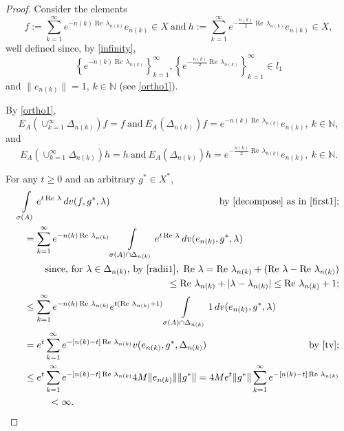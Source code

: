\documentclass{amsart}
\theoremstyle{plain}
\theoremstyle{definition}
\begin{document}
\begin{proof}
Consider the elements
\begin{equation*}
f:=\sum_{k=1}^\infty e^{-n(k)\operatorname{Re\,}\lambda_{n(k)}}e_{n(k)}\in X
\ \text{and}\ h:=\sum_{k=1}^\infty e^{-\frac{n(k)}{2}\operatorname{Re\,}\lambda_{n(k)}}e_{n(k)}\in X,
\end{equation*}
well defined since, by \eqref{infinity},
\[
\left\{e^{-n(k)\operatorname{Re\,}\lambda_{n(k)}}\right\}_{k=1}^\infty,
\left\{e^{-\frac{n(k)}{2}\operatorname{Re\,}\lambda_{n(k)}}\right\}_{k=1}^\infty
\in l_1
\]
and $\|e_{n(k)}\|=1$, $k\in{{\mathbb N}}$ (see \eqref{ortho1}).

By \eqref{ortho1},
\begin{equation}\label{subvectors1}
E_A(\cup_{k=1}^\infty\Delta_{n(k)})f=f\ \text{and}\
E_A(\Delta_{n(k)})f=e^{-n(k)\operatorname{Re\,}\lambda_{n(k)}}e_{n(k)},\
k\in{{\mathbb N}},
\end{equation}
and
\begin{equation}\label{subvectors2}
E_A(\cup_{k=1}^\infty\Delta_{n(k)})h=h\ \text{and}\
E_A(\Delta_{n(k)})h=e^{-\frac{n(k)}{2}\operatorname{Re\,}\lambda_{n(k)}}e_{n(k)},\ k\in{{\mathbb N}}.
\end{equation}

For any $t\ge 0$ and an arbitrary $g^*\in X^*$, 
\begin{multline}\label{first2}
\int\limits_{\sigma(A)}e^{t\operatorname{Re\,}\lambda}\,dv(f,g^*,\lambda)
\hfill
\text{by \eqref{decompose} as in \eqref{first1};}
\\
\shoveleft{
=\sum_{k=1}^\infty e^{-n(k)\operatorname{Re\,}\lambda_{n(k)}}\int\limits_{\sigma(A)\cap\Delta_{n(k)}}e^{t\operatorname{Re\,}\lambda}\,dv(e_{n(k)},g^*,\lambda)
}\\
\hfill
\text{since, for $\lambda\in \Delta_{n(k)}$, by \eqref{radii1},}\ \operatorname{Re\,}\lambda
=\operatorname{Re\,}\lambda_{n(k)}+(\operatorname{Re\,}\lambda-\operatorname{Re\,}\lambda_{n(k)})
\\
\hfill
\le \operatorname{Re\,}\lambda_{n(k)}+|\lambda-\lambda_{n(k)}|\le \operatorname{Re\,}\lambda_{n(k)}+1;
\\
\shoveleft{
\le \sum_{k=1}^\infty e^{-n(k)\operatorname{Re\,}\lambda_{n(k)}}
e^{t(\operatorname{Re\,}\lambda_{n(k)}+1)}
\int\limits_{\sigma(A)\cap\Delta_{n(k)}}1\,dv(e_{n(k)},g^*,\lambda)
}\\
\shoveleft{
= e^t\sum_{k=1}^\infty e^{-[n(k)-t]\operatorname{Re\,}\lambda_{n(k)}}v(e_{n(k)},g^*,\Delta_{n(k)})
\hfill
\text{by \eqref{tv};}
}\\
\shoveleft{
\le e^t\sum_{k=1}^\infty e^{-[n(k)-t]\operatorname{Re\,}\lambda_{n(k)}}4M\|e_{n(k)}\|\|g^*\|
= 4Me^t\|g^*\|\sum_{k=1}^\infty e^{-[n(k)-t]\operatorname{Re\,}\lambda_{n(k)}}
}\\
\hspace{1.2cm}
<\infty.
\hfill
\end{multline}


\end{proof}
\end{document}
